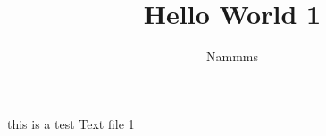 \documentclass{article}
\title{Hello World 1}
\author{Nammms}
\begin{document}
\maketitle

this is a test Text file 1
\end{document}
